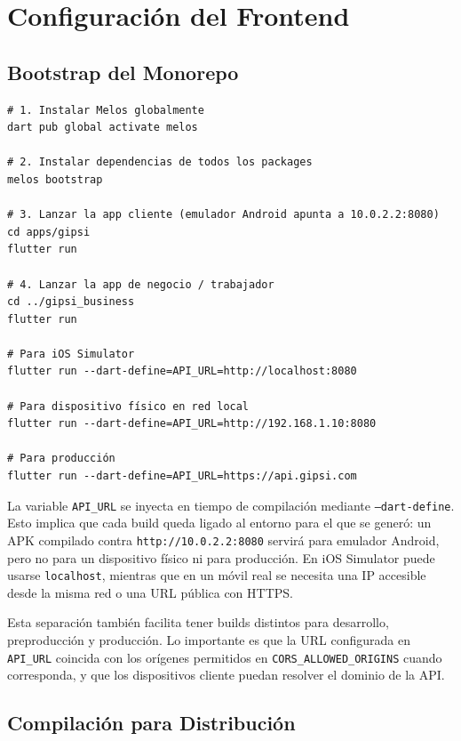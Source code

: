 \documentclass[12pt,a4paper,twoside]{report}
\begin{document}
\section{Configuración del Frontend}

\subsection{Bootstrap del Monorepo}

\begin{lstlisting}[style=yamlStyle, caption={Proceso de setup del frontend}, label={lst:setup-frontend}]
# 1. Instalar Melos globalmente
dart pub global activate melos

# 2. Instalar dependencias de todos los packages
melos bootstrap

# 3. Lanzar la app cliente (emulador Android apunta a 10.0.2.2:8080)
cd apps/gipsi
flutter run

# 4. Lanzar la app de negocio / trabajador
cd ../gipsi_business
flutter run

# Para iOS Simulator
flutter run --dart-define=API_URL=http://localhost:8080

# Para dispositivo físico en red local
flutter run --dart-define=API_URL=http://192.168.1.10:8080

# Para producción
flutter run --dart-define=API_URL=https://api.gipsi.com
\end{lstlisting}

La variable \texttt{API\_URL} se inyecta en tiempo de compilación mediante
\texttt{--dart-define}. Esto implica que cada build queda ligado al entorno
para el que se generó: un APK compilado contra \texttt{http://10.0.2.2:8080}
servirá para emulador Android, pero no para un dispositivo físico ni para
producción. En iOS Simulator puede usarse \texttt{localhost}, mientras que en
un móvil real se necesita una IP accesible desde la misma red o una URL pública
con HTTPS.

Esta separación también facilita tener builds distintos para desarrollo,
preproducción y producción. Lo importante es que la URL configurada en
\texttt{API\_URL} coincida con los orígenes permitidos en
\texttt{CORS\_ALLOWED\_ORIGINS} cuando corresponda, y que los dispositivos
cliente puedan resolver el dominio de la API.

\subsection{Compilación para Distribución}
\end{document}
